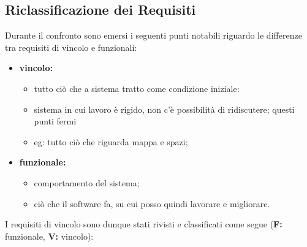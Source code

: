 \subsection{Riclassificazione dei Requisiti}
    Durante il confronto sono emersi i seguenti punti notabili riguardo le differenze tra requisiti di vincolo e funzionali:
    \begin{itemize}
        \item \textbf{vincolo: }
            \begin{itemize}
                \item tutto ciò che a sistema tratto come condizione iniziale:

                \item sistema in cui lavoro è rigido, non c'è possibilità di ridiscutere; questi punti fermi

                \item eg: tutto ciò che riguarda mappa e spazi;
            \end{itemize}
        \item \textbf{funzionale: }
            \begin{itemize}
                \item comportamento del sistema;
                \item ciò che il software fa, su cui posso quindi lavorare e migliorare.
            \end{itemize}
    \end{itemize}
    I requisiti di vincolo sono dunque stati rivisti e classificati come segue (\textbf{F: }funzionale, \textbf{V: }vincolo):
